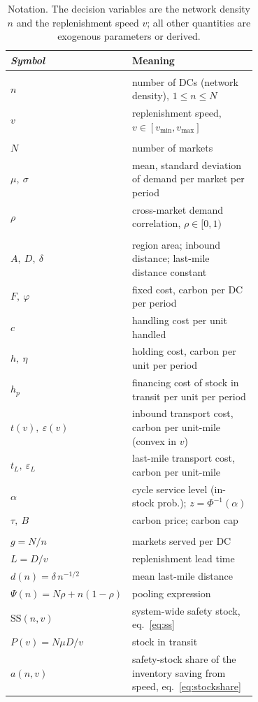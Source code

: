 \documentclass[11pt]{article}
\numberwithin{proposition}{section}
\theoremstyle{definition}
\theoremstyle{remark}
\theoremstyle{plain}
\newcommand{\sstock}{\mathrm{SS}}
\begin{document}
\begin{table}[t]
\centering\small
\caption{Notation. The decision variables are the network density $n$ and the replenishment speed $v$;
all other quantities are exogenous parameters or derived.}
\label{tab:notation}
\begin{tabular}{@{}>{\itshape}l p{0.70\linewidth}@{}}
\toprule
\textbf{Symbol} & \textbf{Meaning} \\
\midrule
\multicolumn{2}{@{}l}{\textbf{Decision variables}}\\
\;\;$n$ & number of DCs (network density), $1\le n\le N$\\
\;\;$v$ & replenishment speed, $v\in[v_{\min},v_{\max}]$\\
\addlinespace
\multicolumn{2}{@{}l}{\textbf{Demand (exogenous)}}\\
\;\;$N$ & number of markets\\
\;\;$\mu,\ \sigma$ & mean, standard deviation of demand per market per period\\
\;\;$\rho$ & cross-market demand correlation, $\rho\in[0,1)$\\
\addlinespace
\multicolumn{2}{@{}l}{\textbf{Geography, cost, carbon (exogenous)}}\\
\;\;$A,\ D,\ \delta$ & region area; inbound distance; last-mile distance constant\\
\;\;$F,\ \varphi$ & fixed cost, carbon per DC per period\\
\;\;$c$ & handling cost per unit handled\\
\;\;$h,\ \eta$ & holding cost, carbon per unit per period\\
\;\;$h_p$ & financing cost of stock in transit per unit per period\\
\;\;$t(v),\ \varepsilon(v)$ & inbound transport cost, carbon per unit-mile (convex in $v$)\\
\;\;$t_L,\ \varepsilon_L$ & last-mile transport cost, carbon per unit-mile\\
\;\;$\alpha$ & cycle service level (in-stock prob.); $z=\Phi^{-1}(\alpha)$\\
\;\;$\tau,\ B$ & carbon price; carbon cap\\
\addlinespace
\multicolumn{2}{@{}l}{\textbf{Derived}}\\
\;\;$g=N/n$ & markets served per DC\\
\;\;$L=D/v$ & replenishment lead time\\
\;\;$d(n)=\delta\,n^{-1/2}$ & mean last-mile distance\\
\;\;$\Psi(n)=N\rho+n(1-\rho)$ & pooling expression\\
\;\;$\sstock(n,v)$ & system-wide safety stock, eq.~\eqref{eq:ss}\\
\;\;$P(v)=N\mu D/v$ & stock in transit\\
\;\;$a(n,v)$ & safety-stock share of the inventory saving from speed, eq.~\eqref{eq:stockshare}\\
\bottomrule
\end{tabular}
\end{table}
\end{document}
